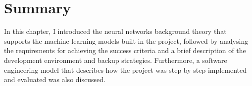 \section{Summary}

In this chapter, I introduced the neural networks background theory that supports the machine learning models built in the project, followed by analysing the requirements for achieving the success criteria and a brief description of the development environment and backup strategies. Furthermore, a software engineering model that describes how the project was step-by-step implemented and evaluated was also discussed. \\

